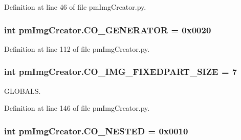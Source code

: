 Definition at line 46 of file pm\-Img\-Creator.\-py.

\hypertarget{namespacepm_img_creator_a9a7b380d1737192967de4b641e4eaa43}{
\subsubsection[{C\-O\-\_\-\-G\-E\-N\-E\-R\-A\-T\-O\-R}]{\setlength{\rightskip}{0pt plus 5cm}int pm\-Img\-Creator.\-C\-O\-\_\-\-G\-E\-N\-E\-R\-A\-T\-O\-R = 0x0020}}\label{namespacepm_img_creator_a9a7b380d1737192967de4b641e4eaa43}


Definition at line 112 of file pm\-Img\-Creator.\-py.

\hypertarget{namespacepm_img_creator_a6d27e7871d6584f02457af699464e7a0}{
\subsubsection[{C\-O\-\_\-\-I\-M\-G\-\_\-\-F\-I\-X\-E\-D\-P\-A\-R\-T\-\_\-\-S\-I\-Z\-E}]{\setlength{\rightskip}{0pt plus 5cm}int pm\-Img\-Creator.\-C\-O\-\_\-\-I\-M\-G\-\_\-\-F\-I\-X\-E\-D\-P\-A\-R\-T\-\_\-\-S\-I\-Z\-E = 7}}\label{namespacepm_img_creator_a6d27e7871d6584f02457af699464e7a0}


G\-L\-O\-B\-A\-L\-S. 



Definition at line 146 of file pm\-Img\-Creator.\-py.

\hypertarget{namespacepm_img_creator_a24d50acc62f4b51642df05ba1ed453dd}{
\subsubsection[{C\-O\-\_\-\-N\-E\-S\-T\-E\-D}]{\setlength{\rightskip}{0pt plus 5cm}int pm\-Img\-Creator.\-C\-O\-\_\-\-N\-E\-S\-T\-E\-D = 0x0010}}\label{namespacepm_img_creator_a24d50acc62f4b51642df05ba1ed453dd}


